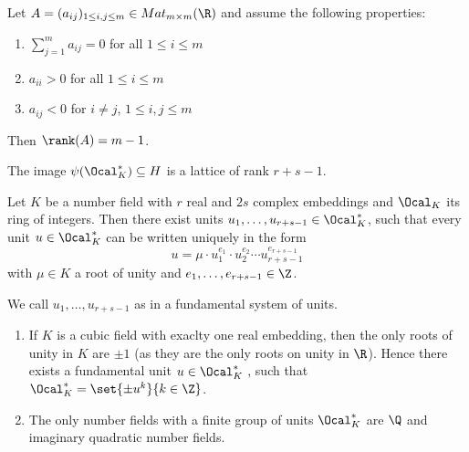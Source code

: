 \begin{lem}
	Let \( A = (a_{ij})_{1 \leq i,j \leq m} \in Mat_{m \times m}(\R) \) and assume the following properties:
	\begin{enumerate}[label=(\roman*)]
		\item \( \sum_{j=1}^m a_{ij} = 0 \) for all \( 1 \leq i \leq m \)
		\item \( a_{ii} > 0 \) for all \( 1 \leq i \leq m \)
		\item \( a_{ij} < 0 \) for \( i \neq j \), \( 1 \leq i,j \leq m \)
	\end{enumerate}
	Then \( \rank(A) = m-1 \).
\end{lem}

\begin{cor}
	The image \( \psi(\Ocal_K^*) \subseteq H \) is a lattice of rank \( r+s-1 \).
\end{cor}

\begin{thmn}\label{thm:3.33} 
	Let \( K \) be a number field with \( r \) real and \( 2s \) complex embeddings and \( \Ocal_K \) its ring of integers.
	Then there exist units \( u_1, \dotsc, u_{r+s-1} \in \Ocal_K^* \), such that every unit \( u \in \Ocal_K^* \) can be written uniquely in the form
	\[ u = \mu \cdot u_1^{e_1} \cdot u_2^{e_2} \dotsm u_{r+s-1}^{e_{r+s-1}} \]
	with \( \mu \in K \) a root of unity and \( e_1, \dotsc, e_{r+s-1} \in \Z \).
\end{thmn}

\begin{rem*}
	We call \( u_1, \dotsc, u_{r+s-1} \) as in  a fundamental system of units.
\end{rem*}

\begin{exmp*}
	\begin{enumerate}
		\item If \( K \) is a cubic field with exaclty one real embedding, then the only roots of unity in \( K \) are \( \pm 1 \) (as they are the only roots on unity in \( \R \)).
			Hence there exists a fundamental unit \( u \in \Ocal_K^* \) , such that \( \Ocal_K^* = \set{\pm u^k}{k \in \Z} \).
		\item The only number fields with a finite group of units \( \Ocal_K^* \) are \( \Q \) and imaginary quadratic number fields.
	\end{enumerate}
\end{exmp*}